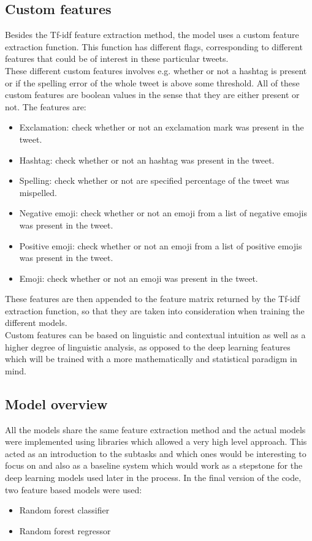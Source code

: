 \subsection{Custom features} \label{sec:customfeat}
Besides the Tf-idf feature extraction method, the model uses a custom feature extraction function. This function has different flags, corresponding to different features that could be of interest in these particular tweets. \\
These different custom features involves e.g. whether or not a hashtag is present or if the spelling error of the whole tweet is above some threshold. All of these custom features are boolean values in the sense that they are either present or not. The features are:\\
\begin{itemize}
\item Exclamation: check whether or not an exclamation mark was present in the tweet.
\item Hashtag: check whether or not an hashtag was present in the tweet.
\item Spelling: check whether or not are specified percentage of the tweet was mispelled.
\item Negative emoji: check whether or not an emoji from a list of negative emojis was present in the tweet.
\item Positive emoji: check whether or not an emoji from a list of positive emojis was present in the tweet.
\item Emoji: check whether or not an emoji was present in the tweet.
\end{itemize}
These features are then appended to the feature matrix returned by the Tf-idf extraction function, so that they are taken into consideration when training the different models. \\
Custom features can be based on linguistic and contextual intuition as well as a higher degree of linguistic analysis, as opposed to the deep learning features which will be trained with a more mathematically and statistical paradigm in mind.

\subsection{Model overview}
All the models share the same feature extraction method and the actual models were implemented using libraries which allowed a very high level approach. This acted as an introduction to the subtasks and which ones would be interesting to focus on and also as a baseline system which would work as a stepstone for the deep learning models used later in the process. In the final version of the code, two feature based models were used:\\
\begin{itemize}
 \item Random forest classifier
 \item Random forest regressor
\end{itemize}

